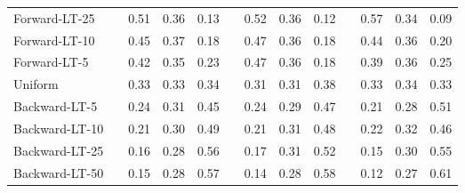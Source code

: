 \documentclass{article}
\begin{document}
\begin{table*}[h]
\begin{center}
\begin{threeparttable}
{\begin{tabular}{lcccccccccccc}
        Forward-LT-25   &&  0.51& 0.36& 0.13& &    0.52& 0.36& 0.12& &  0.57& 0.34& 0.09  \\ 
         Forward-LT-10  &&   0.45& 0.37& 0.18& &   0.47& 0.36& 0.18& &  0.44& 0.36& 0.20  \\ 
         Forward-LT-5   &&  0.42& 0.35& 0.23& &    0.47& 0.36& 0.18 & & 0.39& 0.36& 0.25    \\  
         Uniform     &&   0.33& 0.33& 0.34& &    0.31& 0.31& 0.38& &  0.33& 0.34& 0.33 \\  
         Backward-LT-5  &&  0.24& 0.31& 0.45& &0.24& 0.29& 0.47& &    0.21& 0.28& 0.51      \\  
          Backward-LT-10  &&  0.21& 0.30& 0.49& &  0.21& 0.31& 0.48& &    0.22& 0.32& 0.46  \\ 
          Backward-LT-25  &&  0.16& 0.28& 0.56& &      0.17& 0.31& 0.52& & 0.15& 0.30& 0.55 \\ 
         Backward-LT-50    &&   0.15& 0.28& 0.57& &0.14& 0.28& 0.58& &     0.12& 0.27& 0.61  \\      
        \bottomrule

	\end{tabular}} 
	 \end{threeparttable} 
	 \end{center}  \vspace{0.1in}
\end{table*} 
 
  
\end{document}
